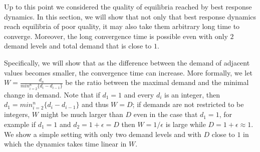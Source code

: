 
Up to this point we considered the quality of equilibria reached by best response dynamics. In this section, we will show that not only that best response dynamics reach equilibria of poor quality, it may also take them arbitrary long time to converge.
Moreover, the long convergence time is possible even with only $2$ demand levels and total demand that is close to $1$.

Specifically, we will show that as the difference between the demand of adjacent values becomes smaller, the convergence time can increase.
More formally, we let
$W=\frac{d_n}{min_{i=2}^n \{d_i-d_{i-1}\}}$ be the ratio between the maximal demand and the minimal change in demand.
Note that if $d_1=1$ and every $d_i$ is an integer, then 
$d_1=min_{i=2}^n \{d_i-d_{i-1}\}$ and thus
$W=D$; %
if demands are not restricted to be integers, $W$ might be much larger than $D$ even in the case that $d_1=1$,
for example if $d_1=1$ and $d_2=1+\epsilon=D$
then $W=1/\epsilon$ is large while $D=1+\epsilon\approx 1$.
We show a simple setting with only two demand levels and with $D$ close to $1$ in which the dynamics takes time linear in $W$.



